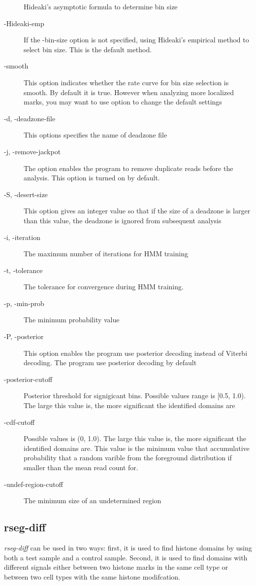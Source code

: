 \documentclass[11pt]{report}
\begin{document}
\begin{description}
  Hideaki's asymptotic formula to determine bin size
\item[-Hideaki-emp] If the -bin-size option is not specified, using
  Hideaki's empirical method to select bin size. This is the default
  method.
\item[-smooth] This option indicates whether the rate curve for bin
  size selection is smooth. By default it is true. However when
  analyzing more localized marks, you may want to use option to change
  the default settings
\item[-d, -deadzone-file] This options specifies the name of deadzone
  file
\item[-j, -remove-jackpot] The option enables the program to remove
  duplicate reads before the analysis. This option is turned on by
  default.
\item[-S, -desert-size] This option gives an integer value so that if
  the size of a deadzone is larger than this value, the deadzone is
  ignored from subsequent analysis
\item[-i, -iteration] The maximum number of iterations for HMM
  training
\item[-t, -tolerance] The tolerance for convergence during HMM
  training.
\item[-p, -min-prob] The minimum probability value
\item[-P, -posterior] This option enables the program use posterior
  decoding instead of Viterbi decoding. The program use posterior
  decoding by default
\item[-posterior-cutoff] Posterior threshold for signigicant
  bins. Possible values range is [0.5, 1.0). The large this value is,
  the more significant the identified domains are
\item[-cdf-cutoff] Possible values is (0, 1.0). The large this value
  is, the more significant the identified domains are. This value is
  the minimum value that accumulative probability that a random
  varible from the foreground distribution if smaller than the mean
  read count for.
\item[-undef-region-cutoff] The minimum size of an undetermined region
\end{description}

\subsection{rseg-diff}
\label{sec:rseg-diff-detail}

\textit{rseg-diff} can be used in two ways: first, it is used to find
histone domains by using both a test sample and a control
sample. Second, it is used to find domains with different signals
either between two histone marks in the same cell type or between two
cell types with the same histone modifcation. 
\end{document}
